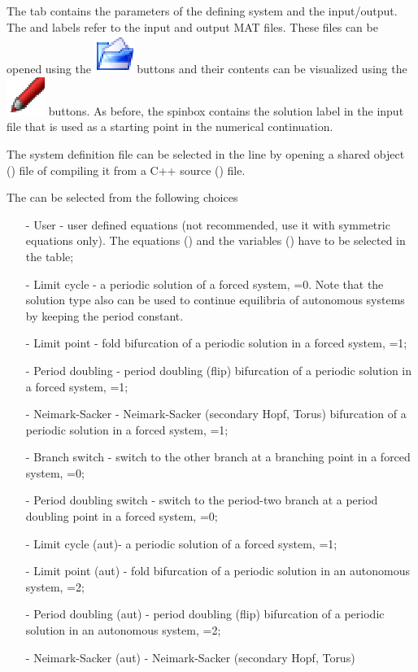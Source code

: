 \documentclass[10pt,a4paper]{ddedoc}
\def\iconPencil{\includegraphics[scale=0.5]{fig/cr22-action-pencil.eps}}
\def\iconOpen{\includegraphics[scale=0.5]{fig/cr22-action-fileopen.eps}}
\begin{document}
The  tab contains the parameters of the defining system and the
input/output. The  and  labels refer to the input and
output MAT files. These files can be opened using the  \iconOpen{}
buttons and their contents can be visualized using the 
\iconPencil{}
buttons. As before, the  spinbox contains the solution label in
the input file that is used as a starting point in the numerical continuation.

The system definition file can be selected in the  line by
opening a shared object () file of compiling it from a C++ source
() file.

The  can be selected from the following choices
\begin{itemize}
\item[-] User - user defined equations (not recommended, use
it with symmetric equations only). The equations () and the
variables () have to be selected in the table;
\item[-] Limit cycle - a periodic solution of a forced system, =0. Note that the solution type also can be used to continue equilibria of autonomous systems by keeping the period constant.
\item[-] Limit point - fold bifurcation of a periodic solution in a forced
system, =1;
\item[-] Period doubling - period doubling (flip) bifurcation of a periodic
solution in a forced system, =1;
\item[-] Neimark-Sacker - Neimark-Sacker (secondary Hopf, Torus) bifurcation of
a periodic solution in a forced system, =1;
\item[-] Branch switch - switch to the other branch at a branching point in a
forced system, =0;
\item[-] Period doubling switch - switch to the period-two branch at a period
doubling point in a forced system, =0;
\item[-] Limit cycle (aut)- a periodic solution of a forced system,
=1;
\item[-] Limit point (aut) - fold bifurcation of a periodic solution in an
autonomous system, =2;
\item[-] Period doubling (aut) - period doubling (flip) bifurcation of a
periodic solution in an autonomous system, =2;
\item[-] Neimark-Sacker (aut) - Neimark-Sacker (secondary Hopf, Torus)

\end{itemize}
\end{document}
